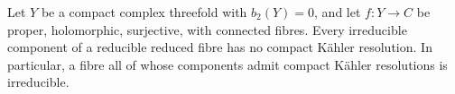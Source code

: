 
\begin{proposition}\hypertarget{tag-01FA}{}\label{cdp:st:C.3.4}


Let $Y$ be a compact complex threefold with $b_2(Y)=0$, and let
$f:Y\to C$ be proper, holomorphic, surjective, with connected fibres.
Every irreducible component of a reducible reduced fibre has no
compact K\"ahler resolution. In particular, a fibre all of whose
components admit compact K\"ahler resolutions is irreducible.
\end{proposition}

